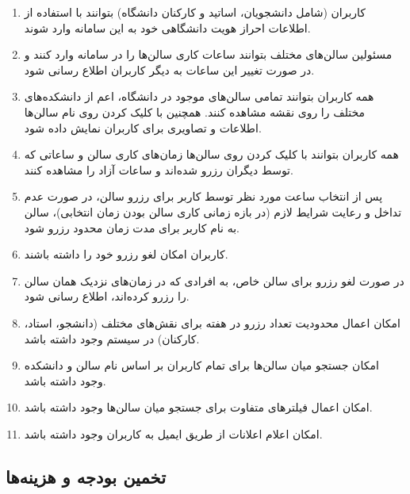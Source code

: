 \begin{enumerate}
	\item{
کاربران (شامل دانشجویان، اساتید و کارکنان دانشگاه) بتوانند با استفاده از اطلاعات احراز هویت دانشگاهی خود به این سامانه وارد شوند.
	}
	
	\item{
	مسئولین سالن‌های مختلف بتوانند ساعات کاری سالن‌ها را در سامانه وارد کنند و در صورت تغییر این ساعات به دیگر کاربران اطلاع رسانی شود.
	}
	
	\item{
همه کاربران بتوانند تمامی سالن‌های موجود در دانشگاه، اعم از دانشکده‌های مختلف را روی نقشه مشاهده کنند. همچنین با کلیک کردن روی نام سالن‌ها اطلاعات و تصاویری برای کاربران نمایش داده شود.	
	}
	
	\item {
همه کاربران بتوانند با کلیک کردن روی سالن‌ها زمان‌های کاری سالن و ساعاتی که توسط دیگران رزرو شده‌اند و ساعات آزاد را مشاهده کنند.	
	}
	
	\item {
	پس از انتخاب ساعت مورد نظر توسط کاربر برای رزرو سالن، در صورت عدم تداخل و رعایت شرایط لازم (در بازه زمانی کاری سالن بودن زمان انتخابی)، سالن به نام کاربر برای مدت زمان محدود رزرو شود.
	}
	
	\item {
	کاربران امکان لغو رزرو خود را داشته باشند.
	}
	
	\item {
	در صورت لغو رزرو برای سالن خاص، به افرادی که در زمان‌های نزدیک همان سالن را رزرو کرده‌اند، اطلاع رسانی شود.	
	}
	
	\item {
	امکان اعمال محدودیت تعداد رزرو در هفته برای نقش‌های مختلف (دانشجو، استاد، کارکنان) در سیستم وجود داشته باشد.
	}
	
	\item {
امکان جستجو میان سالن‌ها برای تمام کاربران بر اساس نام سالن و دانشکده وجود داشته باشد.	
	}
	
	\item {
	امکان اعمال فیلتر‌های متفاوت برای جستجو میان سالن‌ها وجود داشته باشد.
	}
	
	\item {
	امکان اعلام اعلانات از طریق ایمیل به کاربران وجود داشته باشد.
	}
\end{enumerate}


\subsection*{
تخمین بودجه و هزینه‌ها
}

